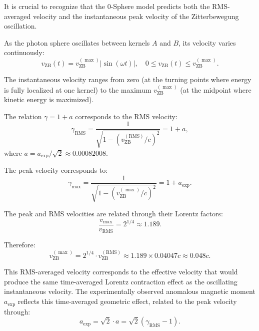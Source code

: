 \documentclass[12pt,letterpaper]{article}
\begin{document}
It is crucial to recognize that the 0-Sphere model predicts both the RMS-averaged velocity and the instantaneous peak velocity of the Zitterbewegung oscillation.

As the photon sphere oscillates between kernels $A$ and $B$, its velocity varies continuously:
\begin{equation}
v_{\mathrm{ZB}}(t) = v_{\mathrm{ZB}}^{(\max)} |\sin(\omega t)|, 
\quad 0 \le v_{\mathrm{ZB}}(t) \le v_{\mathrm{ZB}}^{(\max)}.
\end{equation}

The instantaneous velocity ranges from zero (at the turning points where energy is fully localized at one kernel) to the maximum $v_{\mathrm{ZB}}^{(\max)}$ (at the midpoint where kinetic energy is maximized).

The relation $\gamma = 1 + a$ corresponds to the RMS velocity:
\begin{equation}
\gamma_{\mathrm{RMS}} = \frac{1}{\sqrt{1 - (v_{\mathrm{ZB}}^{(\mathrm{RMS})}/c)^2}} = 1 + a,
\end{equation}
where $a = a_{\mathrm{exp}}/\sqrt{2} \approx 0.00082008$.

The peak velocity corresponds to:
\begin{equation}
\gamma_{\max} = \frac{1}{\sqrt{1 - (v_{\mathrm{ZB}}^{(\max)}/c)^2}} = 1 + a_{\mathrm{exp}}.
\end{equation}

The peak and RMS velocities are related through their Lorentz factors:
\begin{equation}
\frac{v_{\max}}{v_{\mathrm{RMS}}} = 2^{1/4} \approx 1.189.
\end{equation}

Therefore:
\begin{equation}
v_{\mathrm{ZB}}^{(\max)} = 2^{1/4} \cdot v_{\mathrm{ZB}}^{(\mathrm{RMS})} \approx 1.189 \times 0.04047c \approx 0.048c.
\end{equation}

This RMS-averaged velocity corresponds to the effective velocity that would produce the same time-averaged Lorentz contraction effect as the oscillating instantaneous velocity. The experimentally observed anomalous magnetic moment $a_{\mathrm{exp}}$ reflects this time-averaged geometric effect, related to the peak velocity through:
\begin{equation}
a_{\mathrm{exp}} = \sqrt{2} \cdot a = \sqrt{2}(\gamma_{\mathrm{RMS}} - 1).
\end{equation}
\end{document}
